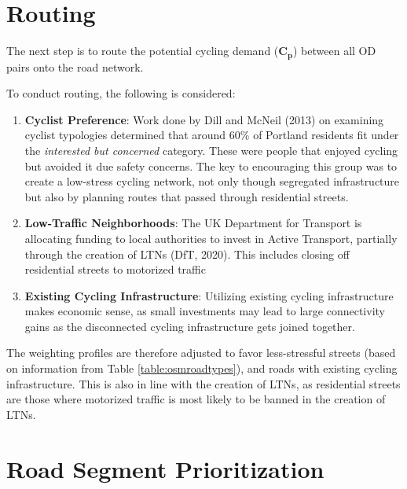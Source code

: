 \documentclass[
]{article}
\providecommand{\tightlist}{%
  \setlength{\itemsep}{0pt}\setlength{\parskip}{0pt}}
\begin{document}
\hypertarget{routing}{%
\section{Routing}\label{routing}}

The next step is to route the potential cycling demand
(\(\boldsymbol{C_{p}}\)) between all OD pairs onto the road network.

To conduct routing, the following is considered:

\begin{enumerate}
\def\labelenumi{\arabic{enumi}.}
\tightlist
\item
  \textbf{Cyclist Preference}: Work done by Dill and McNeil (2013) on
  examining cyclist typologies determined that around 60\% of Portland
  residents fit under the \emph{interested but concerned} category.
  These were people that enjoyed cycling but avoided it due safety
  concerns. The key to encouraging this group was to create a low-stress
  cycling network, not only though segregated infrastructure but also by
  planning routes that passed through residential streets.
\item
  \textbf{Low-Traffic Neighborhoods}: The UK Department for Transport is
  allocating funding to local authorities to invest in Active Transport,
  partially through the creation of LTNs (DfT, 2020). This includes
  closing off residential streets to motorized traffic
\item
  \textbf{Existing Cycling Infrastructure}: Utilizing existing cycling
  infrastructure makes economic sense, as small investments may lead to
  large connectivity gains as the disconnected cycling infrastructure
  gets joined together.
\end{enumerate}

The weighting profiles are therefore adjusted to favor less-stressful
streets (based on information from Table \ref{table:osmroadtypes}), and
roads with existing cycling infrastructure. This is also in line with
the creation of LTNs, as residential streets are those where motorized
traffic is most likely to be banned in the creation of LTNs.

\hypertarget{road-segment-prioritization}{%
\section{Road Segment
Prioritization}\label{road-segment-prioritization}}
\end{document}
